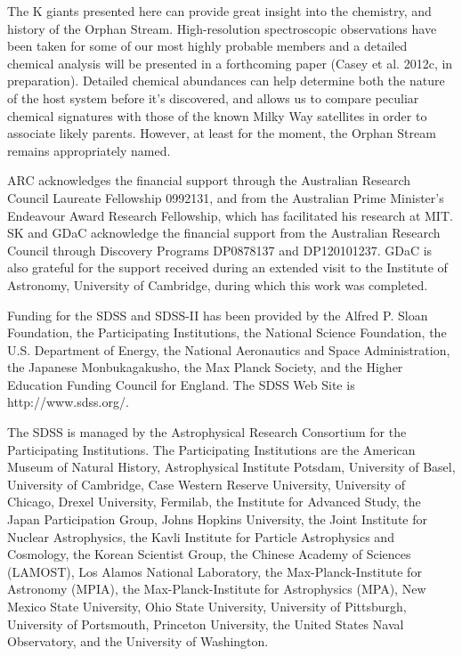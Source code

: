 \documentclass[10pt,apjl]{emulateapj}
\begin{document}
The K giants presented here can provide great insight into the chemistry, and history of the Orphan Stream. High-resolution spectroscopic observations have been taken for some of our most highly probable members and a detailed chemical analysis will be presented in a forthcoming paper (Casey et al. 2012c, in preparation). Detailed chemical abundances can help determine both the nature of the host system before it's discovered, and allows us to compare peculiar chemical signatures with those of the known Milky Way satellites in order to associate likely parents. However, at least for the moment, the Orphan Stream remains appropriately named.


\acknowledgements
ARC acknowledges the financial support through the Australian Research Council Laureate Fellowship 0992131, and from the Australian Prime Minister's Endeavour Award Research Fellowship, which has facilitated his research at MIT. SK and GDaC acknowledge the financial support from the Australian Research Council through Discovery Programs DP0878137 and DP120101237. GDaC is also grateful for the support received during an extended visit to the Institute of Astronomy, University of Cambridge, during which this work was completed.

Funding for the SDSS and SDSS-II has been provided by the Alfred P. Sloan Foundation, the Participating Institutions, the National Science Foundation, the U.S. Department of Energy, the National Aeronautics and Space Administration, the Japanese Monbukagakusho, the Max Planck Society, and the Higher Education Funding Council for England. The SDSS Web Site is http://www.sdss.org/.

The SDSS is managed by the Astrophysical Research Consortium for the Participating Institutions. The Participating Institutions are the American Museum of Natural History, Astrophysical Institute Potsdam, University of Basel, University of Cambridge, Case Western Reserve University, University of Chicago, Drexel University, Fermilab, the Institute for Advanced Study, the Japan Participation Group, Johns Hopkins University, the Joint Institute for Nuclear Astrophysics, the Kavli Institute for Particle Astrophysics and Cosmology, the Korean Scientist Group, the Chinese Academy of Sciences (LAMOST), Los Alamos National Laboratory, the Max-Planck-Institute for Astronomy (MPIA), the Max-Planck-Institute for Astrophysics (MPA), New Mexico State University, Ohio State University, University of Pittsburgh, University of Portsmouth, Princeton University, the United States Naval Observatory, and the University of Washington.
\end{document}
